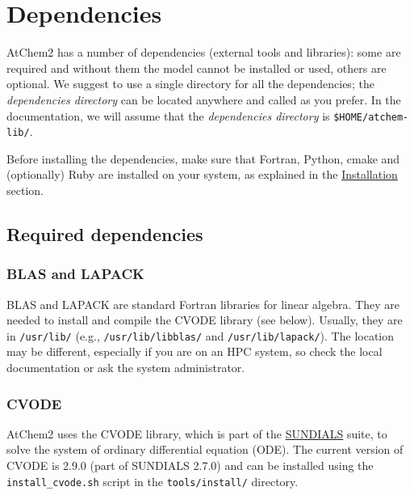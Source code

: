 \section{Dependencies} \label{sec:dependencies}

AtChem2 has a number of dependencies (external tools and libraries):
some are required and without them the model cannot be installed or
used, others are optional. We suggest to use a single directory for
all the dependencies; the \emph{dependencies directory} can be located
anywhere and called as you prefer. In the documentation, we will
assume that the \emph{dependencies directory} is
\texttt{\$HOME/atchem-lib/}.

Before installing the dependencies, make sure that Fortran, Python,
cmake and (optionally) Ruby are installed on your system, as explained
in the \hyperref[sec:install]{Installation} section.

\subsection{Required dependencies} \label{subsec:required-dependencies}

\subsubsection{BLAS and LAPACK} \label{blas-and-lapack}

BLAS and LAPACK are standard Fortran libraries for linear
algebra. They are needed to install and compile the CVODE library (see
below). Usually, they are in \texttt{/usr/lib/} (e.g.,
\texttt{/usr/lib/libblas/} and \texttt{/usr/lib/lapack/}). The
location may be different, especially if you are on an HPC system, so
check the local documentation or ask the system administrator.

\subsubsection{CVODE} \label{cvode}

AtChem2 uses the CVODE library, which is part of the
\href{https://computation.llnl.gov/projects/sundials}{SUNDIALS} suite,
to solve the system of ordinary differential equation (ODE). The
current version of CVODE is 2.9.0 (part of SUNDIALS 2.7.0) and can be
installed using the \texttt{install\_cvode.sh} script in the
\texttt{tools/install/} directory.

